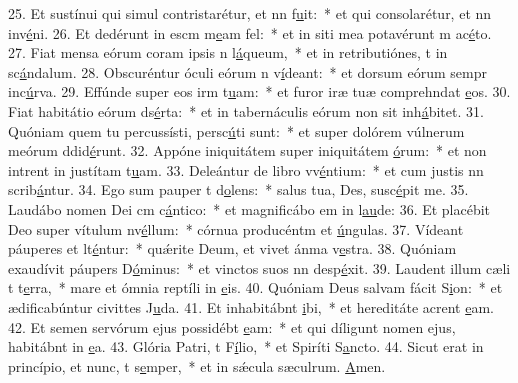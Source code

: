 25. Et sustínui qui simul contristarétur, et nn f\uline{u}it:~* et qui consolarétur, et nn inv\uline{é}ni.
26. Et dedérunt in escm m\uline{e}am fel:~* et in siti mea potavérunt m ac\uline{é}to.
27. Fiat mensa eórum coram ipsis n l\uline{á}queum,~* et in retributiónes, t in sc\uline{á}ndalum.
28. Obscuréntur óculi eórum n v\uline{í}deant:~* et dorsum eórum sempr inc\uline{ú}rva.
29. Effúnde super eos irm t\uline{u}am:~* et furor iræ tuæ comprehndat \uline{e}os.
30. Fiat habitátio eórum ds\uline{é}rta:~* et in tabernáculis eórum non sit  inh\uline{á}bitet.
31. Quóniam quem tu percussísti, persc\uline{ú}ti sunt:~* et super dolórem vúlnerum meórum ddid\uline{é}runt.
32. Appóne iniquitátem super iniquitátem \uline{ó}rum:~* et non intrent in justítam t\uline{u}am.
33. Deleántur de libro vv\uline{é}ntium:~* et cum justis nn scrib\uline{á}ntur.
34. Ego sum pauper t d\uline{o}lens:~* salus tua, Des, susc\uline{é}pit me.
35. Laudábo nomen Dei cm c\uline{á}ntico:~* et magnificábo em in l\uline{au}de:
36. Et placébit Deo super vítulum nv\uline{é}llum:~* córnua producéntm et \uline{ú}ngulas.
37. Vídeant páuperes et lt\uline{é}ntur:~* quǽrite Deum, et vivet ánma v\uline{e}stra.
38. Quóniam exaudívit páupers D\uline{ó}minus:~* et vinctos suos nn desp\uline{é}xit.
39. Laudent illum cæli t t\uline{e}rra,~* mare et ómnia reptíli in \uline{e}is.
40. Quóniam Deus salvam fácit S\uline{i}on:~* et ædificabúntur civittes J\uline{u}da.
41. Et inhabitábnt \uline{i}bi,~* et hereditáte acrent \uline{e}am.
42. Et semen servórum ejus possidébt \uline{e}am:~* et qui díligunt nomen ejus, habitábnt in \uline{e}a.
43. Glória Patri, t F\uline{í}lio,~* et Spiríti S\uline{a}ncto.
44. Sicut erat in princípio, et nunc, t s\uline{e}mper,~* et in sǽcula sæculrum. \uline{A}men.
